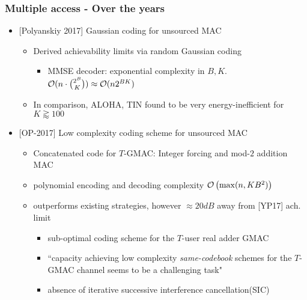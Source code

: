 \begin{frame} \frametitle{Multiple access - Over the years}
	\begin{itemize} 
	\item {[Polyanskiy 2017]} Gaussian coding for unsourced MAC 
	\vspace{3pt}
	\begin{itemize}	\setlength{\itemsep}{4pt}
		\item Derived achievability limits via random Gaussian coding 
			\begin{itemize}
				\item MMSE decoder: {\color{red} exponential complexity} in $B,K$. $\mathcal{O}(n\cdot\binom{2^B}{K})\approx\mathcal{O}(n2^{BK})$
			\end{itemize}
			\item In comparison, ALOHA, TIN found to be very energy-inefficient for $K\gtrapprox100$
	\end{itemize}
	\pause 
	\vspace{4ex}
	\item {[OP-2017]} Low complexity coding scheme for unsourced MAC
	\begin{itemize}\setlength{\itemsep}{4pt}
		\item Concatenated code for $T$-GMAC: Integer forcing and mod-$2$ addition MAC 
		\item {\color{blue} polynomial} encoding and decoding complexity $\mathcal{O}\left(\max(n, KB^2)\right)$
		\item {\color{blue} outperforms} existing strategies, however {\color{red} $\approx 20dB$ away} from [YP17] ach. limit
		\pause
		\begin{itemize}	\setlength{\itemsep}{2pt}
		\item sub-optimal coding scheme for the $T$-user real adder GMAC
		\item ``capacity achieving low complexity \emph{same-codebook} schemes for the $T$-GMAC channel seems to be a challenging task"
		\item absence of iterative successive interference cancellation(SIC)
		\end{itemize}
	\end{itemize}
\end{itemize}
\end{frame}

